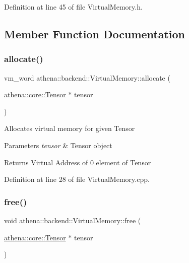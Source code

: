 Definition at line 45 of file Virtual\+Memory.\+h.



\subsection{Member Function Documentation}
\mbox{\label{classathena_1_1backend_1_1_virtual_memory_a22be58a8e0cb574a7d46d4095cb64ac5}} 
\subsubsection{\texorpdfstring{allocate()}{allocate()}}
{\footnotesize\ttfamily vm\+\_\+word athena\+::backend\+::\+Virtual\+Memory\+::allocate (\begin{DoxyParamCaption}\item[{\mbox{\hyperlink{classathena_1_1core_1_1_tensor}{athena\+::core\+::\+Tensor}} $\ast$}]{tensor }\end{DoxyParamCaption})}

Allocates virtual memory for given Tensor 
\begin{DoxyParams}{Parameters}
{\em tensor} & Tensor object \\
\hline
\end{DoxyParams}
\begin{DoxyReturn}{Returns}
Virtual Address of 0 element of Tensor 
\end{DoxyReturn}


Definition at line 28 of file Virtual\+Memory.\+cpp.

\mbox{\label{classathena_1_1backend_1_1_virtual_memory_a73815358c436f8f6dd73d49d4d5d189d}} 
\subsubsection{\texorpdfstring{free()}{free()}\hspace{0.1cm}{\footnotesize\ttfamily [1/2]}}
{\footnotesize\ttfamily void athena\+::backend\+::\+Virtual\+Memory\+::free (\begin{DoxyParamCaption}\item[{\mbox{\hyperlink{classathena_1_1core_1_1_tensor}{athena\+::core\+::\+Tensor}} $\ast$}]{tensor }\end{DoxyParamCaption})}

